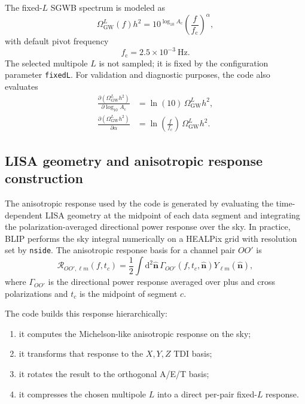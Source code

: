 \documentclass[11pt]{article}
\newcommand{\OmL}{\Omega_{\mathrm{GW}}^{L}}
\newcommand{\fc}{f_{\mathrm{c}}}
\newcommand{\vect}[1]{\bm{#1}}
\newcommand{\dd}{\mathrm{d}}
\begin{document}
The fixed-$L$ SGWB spectrum is modeled as
\begin{equation}
  \OmL(f) h^2
  =
  10^{\log_{10} A_{\mathrm{c}}}
  \left(\frac{f}{\fc}\right)^{\alpha},
  \label{eq:fixedL-spectrum}
\end{equation}
with default pivot frequency
\begin{equation}
  \fc = 2.5 \times 10^{-3}~\mathrm{Hz}.
\end{equation}
The selected multipole $L$ is not sampled; it is fixed by the configuration parameter \texttt{fixedL}. For validation and diagnostic purposes, the code also evaluates
\begin{align}
  \frac{\partial (\OmL h^2)}{\partial \log_{10} A_{\mathrm{c}}}
  &= \ln(10)\,\OmL h^2, \\
  \frac{\partial (\OmL h^2)}{\partial \alpha}
  &= \ln\!\left(\frac{f}{\fc}\right)\,\OmL h^2.
\end{align}

\subsection{LISA geometry and anisotropic response construction}

The anisotropic response used by the code is generated by evaluating the time-dependent LISA geometry at the midpoint of each data segment and integrating the polarization-averaged directional power response over the sky. In practice, BLIP performs the sky integral numerically on a HEALPix grid with resolution set by \texttt{nside}. The anisotropic response basis for a channel pair $OO'$ is
\begin{equation}
  \mathcal{R}_{OO',\ell m}(f,t_c)
  =
  \frac{1}{2}
  \int \dd^2 \hat{\vect{n}}\,
  \Gamma_{OO'}(f,t_c,\hat{\vect{n}})
  Y_{\ell m}(\hat{\vect{n}}),
  \label{eq:response-basis}
\end{equation}
where $\Gamma_{OO'}$ is the directional power response averaged over plus and cross polarizations and $t_c$ is the midpoint of segment $c$.

The code builds this response hierarchically:
\begin{enumerate}[leftmargin=2.2em]
  \item it computes the Michelson-like anisotropic response on the sky;
  \item it transforms that response to the $X,Y,Z$ TDI basis;
  \item it rotates the result to the orthogonal A/E/T basis;
  \item it compresses the chosen multipole $L$ into a direct per-pair fixed-$L$ response.
\end{enumerate}
\end{document}
